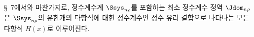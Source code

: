 
\S\ 7에서와 마찬가지로, 정수계수계 $\Ssys_{n\rho}$를 포함하는 최소 정수계수 정역 $\Jdom_{n\rho}$은 $\Ssys_{n\rho}$의 유한개의 다항식에 대한 정수계수인 정수 유리 결합으로 나타나는 모든 다항식 $H(x)$로 이루어진다.
